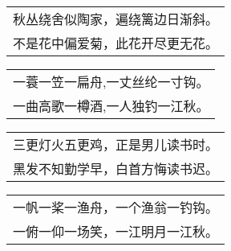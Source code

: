 \nopagebreak%
\nopagebreak%
\noindent\begin{minipage}{\linewidth}
  \vskip-3pt\begin{table}[H]
    \centering
    \begin{tabular}{@{}l@{}}
秋丛绕舍似陶家，遍绕篱边日渐斜。\\
不是花中偏爱菊，此花开尽更无花。
    \end{tabular}
  \end{table}
\end{minipage}
\vspace{1cm}


\nopagebreak%
\nopagebreak%
\noindent\begin{minipage}{\linewidth}
  \vskip-3pt\begin{table}[H]
    \centering
    \begin{tabular}{@{}l@{}}
一蓑一笠一扁舟,一丈丝纶一寸钩。\\
一曲高歌一樽酒,一人独钓一江秋。
    \end{tabular}
  \end{table}
\end{minipage}
\vspace{1cm}


\nopagebreak%
\nopagebreak%
\noindent\begin{minipage}{\linewidth}
  \vskip-3pt\begin{table}[H]
    \centering
    \begin{tabular}{@{}l@{}}
三更灯火五更鸡，正是男儿读书时。\\
黑发不知勤学早，白首方悔读书迟。
    \end{tabular}
  \end{table}
\end{minipage}
\vspace{1cm}


\nopagebreak%
\nopagebreak%
\noindent\begin{minipage}{\linewidth}
  \vskip-3pt\begin{table}[H]
    \centering
    \begin{tabular}{@{}l@{}}
一帆一桨一渔舟，一个渔翁一钓钩。\\
一俯一仰一场笑，一江明月一江秋。
    \end{tabular}
  \end{table}
\end{minipage}
\vspace{1cm}


